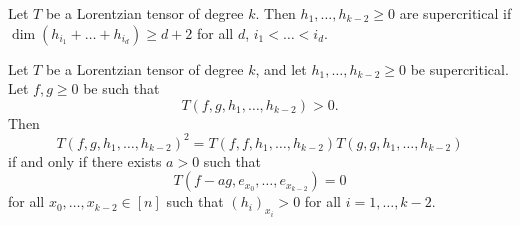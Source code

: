 \documentclass[12pt]{article}
\begin{document}
\begin{defn}
	Let $T$ be a Lorentzian tensor of degree $k$. Then $h_1, \ldots, h_{k-2} \geq 0$ are supercritical if $\dim (h_{i_1} + \ldots + h_{i_d}) \geq d+2$ for all $d$, $i_1 < \ldots < i_d$. 
\end{defn}

\begin{thm}
	Let $T$ be a Lorentzian tensor of degree $k$, and let $h_1, \ldots, h_{k-2} \geq 0$ be supercritical. Let $f, g \geq 0$ be such that 
	\[
		T(f, g, h_1, \ldots, h_{k-2}) > 0.
	\]
	Then 
	\[
		T(f, g, h_1, \ldots, h_{k-2})^2 = T(f, f, h_1, \ldots, h_{k-2}) T(g, g, h_1, \ldots, h_{k-2})
	\]
	if and only if there exists $a > 0$ such that 
	\[
		T(f - ag, e_{x_0}, \ldots, e_{x_{k-2}}) = 0
	\]
	for all $x_0, \ldots, x_{k-2} \in [n]$ such that $(h_i)_{x_i} > 0$ for all $i = 1, \ldots, k-2$. 
\end{thm}


\end{document}
